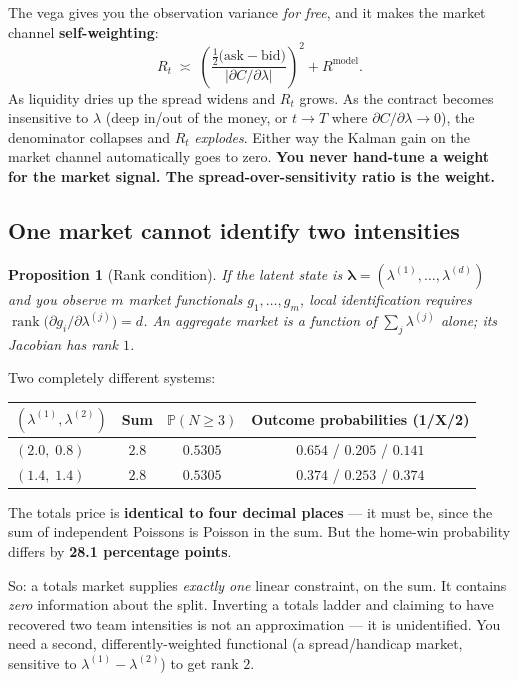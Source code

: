 \documentclass[11pt,a4paper]{article}
\theoremstyle{plain}
\newtheorem{proposition}{Proposition}
\begin{document}
\begin{point}
The vega gives you the observation variance \emph{for free}, and it makes the market channel
\textbf{self-weighting}:
\[
  R_t \;\asymp\;
  \left(\frac{\tfrac12\big(\text{ask}-\text{bid}\big)}{\big|\partial C/\partial\lambda\big|}\right)^{\!2}
  + R^{\text{model}}.
\]
As liquidity dries up the spread widens and $R_t$ grows. As the contract becomes insensitive to
$\lambda$ (deep in/out of the money, or $t\to T$ where $\partial C/\partial\lambda\to0$), the
denominator collapses and $R_t$ \emph{explodes}. Either way the Kalman gain on the market
channel automatically goes to zero. \textbf{You never hand-tune a weight for the market signal.
The spread-over-sensitivity ratio is the weight.}
\end{point}

\subsection*{One market cannot identify two intensities}

\begin{proposition}[Rank condition]
If the latent state is $\boldsymbol\lambda = (\lambda^{(1)},\dots,\lambda^{(d)})$ and you observe
$m$ market functionals $g_1,\dots,g_m$, local identification requires
$\operatorname{rank}\big(\partial g_i/\partial\lambda^{(j)}\big) = d$. An \emph{aggregate}
market is a function of $\sum_j\lambda^{(j)}$ alone; its Jacobian has rank $1$.
\end{proposition}

\begin{worked}
Two completely different systems:
\begin{center}
\begin{tabular}{@{}lccc@{}}
\toprule
$(\lambda^{(1)},\lambda^{(2)})$ & Sum & $\mathbb{P}(N\ge3)$ & Outcome probabilities (1/X/2) \\
\midrule
$(2.0,\;0.8)$ & $2.8$ & $\mathbf{0.5305}$ & $0.654$ / $0.205$ / $0.141$ \\
$(1.4,\;1.4)$ & $2.8$ & $\mathbf{0.5305}$ & $0.374$ / $0.253$ / $0.374$ \\
\bottomrule
\end{tabular}
\end{center}
The totals price is \textbf{identical to four decimal places} --- it must be, since the sum of
independent Poissons is Poisson in the sum. But the home-win probability differs by
\textbf{28.1 percentage points}.

\smallskip
So: a totals market supplies \emph{exactly one} linear constraint, on the sum. It contains
\emph{zero} information about the split. Inverting a totals ladder and claiming to have
recovered two team intensities is not an approximation --- it is unidentified. You need a
second, differently-weighted functional (a spread/handicap market, sensitive to
$\lambda^{(1)}-\lambda^{(2)}$) to get rank $2$.
\end{worked}
\end{document}
